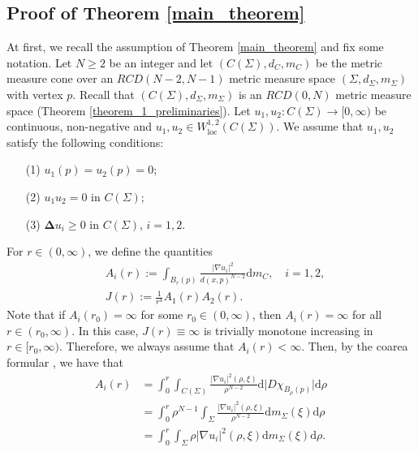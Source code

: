 \documentclass{article}
\theoremstyle{remark}
\numberwithin{equation}{section}
\theoremstyle{definition}
\begin{document}
\subsection{Proof of Theorem \ref{main_theorem}}\label{proof_of_main}
    At first, we recall the assumption of Theorem \ref{main_theorem} and fix some notation. Let $N \ge 2$ be an integer and let $(C(\Sigma),d_{C},m_{C})$ be the metric measure cone over an $RCD(N-2,N-1)$ metric measure space $(\Sigma,d_{\Sigma},m_{\Sigma})$ with vertex $p$. Recall that $(C(\Sigma),d_{\Sigma},m_{\Sigma})$ is an $RCD(0,N)$ metric measure space (Theorem \ref{theorem_1_preliminaries}). Let $u_{1},u_{2} : C(\Sigma) \to [0,\infty)$ be continuous, non-negative and $u_{1},u_{2} \in W^{1,2}_{\mathrm{loc}}(C(\Sigma))$. We assume that $u_{1},u_{2}$ satisfy the following conditions:
    \begin{itemize}
    	\item[(1)] $u_{1}(p)=u_{2}(p)=0$;
    	\item[(2)] $u_{1}u_{2}=0$ in $C(\Sigma)$;
    	\item[(3)] $\mathbf{\Delta} u_{i} \ge 0$ in $C(\Sigma)$, $i=1,2$.
    \end{itemize}
    For $r \in (0,\infty)$, we define the quantities
    \begin{equation}
     	\begin{split}
     		& A_{i}(r) := \int_{B_{r}(p)} \frac{\lvert \nabla u_{i} \rvert^{2}}{d(x,p)^{N-2}} \mathrm{d}m_{C},\quad i=1,2,\\
     		& J(r) := \frac{1}{r^{4}} A_{1}(r)A_{2}(r).
     	\end{split}
    \end{equation}
    Note that if $A_{i}(r_{0})=\infty$ for some $r_{0} \in (0,\infty)$, then $A_{i}(r)=\infty$ for all $r \in (r_{0},\infty)$. In this case, $J(r)\equiv \infty$ is trivially monotone increasing in $r \in [r_{0},\infty)$. Therefore, we always assume that $A_{i}(r) < \infty$. Then, by the coarea formular \cite[Remark 4.3]{Miranda_2003}, we have that
    \begin{equation}
        \begin{split}
     		A_{i}(r) & = \int_{0}^{r} \int_{C(\Sigma)} \frac{\lvert \nabla u_{i} \rvert^{2}(\rho,\xi)}{\rho^{N-2}} \mathrm{d}\lvert D \chi_{B_{\rho}(p)} \rvert \mathrm{d}\rho\\
     		& = \int_{0}^{r}\rho^{N-1}\int_{\Sigma} \frac{\lvert \nabla u_{i} \rvert^{2}(\rho,\xi)}{\rho^{N-2}} \mathrm{d}m_{\Sigma}(\xi) \mathrm{d}\rho\\
     		& = \int_{0}^{r} \int_{\Sigma} \rho \lvert \nabla u_{i} \rvert^{2}(\rho,\xi) \mathrm{d}m_{\Sigma}(\xi) \mathrm{d}\rho.
        \end{split}
    \end{equation}
\end{document}
